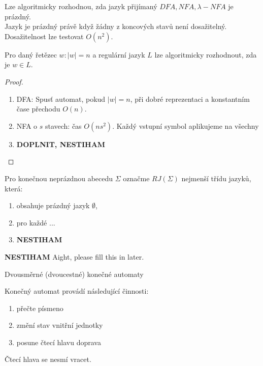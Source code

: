 \documentclass[../main.tex]{subfiles}
\begin{document}
\begin{theorem}
    Lze algoritmicky rozhodnou, zda jazyk přijímaný $DFA,NFA,\lambda -NFA$ je prázdný.\\
    Jazyk je prázdný právě když žádny z koncových stavů není dosažitelný. Dosažitelnost lze testovat $O(n^2)$.
\end{theorem}

\begin{theorem}
    Pro daný řetězec $w: |w| = n$ a regulární jazyk $L$ lze algoritmicky rozhodnout, zda je $w\in L$.
\end{theorem}
\begin{proof}
    \begin{enumerate}
        \item DFA: Spusť automat, pokud $|w| = n$, při dobré reprezentaci a konstantním čase přechodu $O(n)$.
        \item NFA o $s$ stavech: čas $O(ns^2)$. Každý vstupní symbol aplikujeme na všechny 
        \item \textbf{DOPLNIT, NESTIHAM}
    \end{enumerate}
\end{proof}

\begin{definition}
    Pro konečnou neprázdnou abecedu $\Sigma$ označme $RJ(\Sigma)$ nejmenší třídu jazyků, která:
    \begin{enumerate}
        \item obsahuje prázdný jazyk $\emptyset$,
        \item pro každé ... 
        \item \textbf{NESTIHAM}
    \end{enumerate}
\end{definition}
\begin{theorem}[Kleene]
    \textbf{NESTIHAM} Aight, please fill this in later.
\end{theorem}

Dvousměrné (dvoucestné) konečné automaty

Konečný automat provádí následující činnosti:
\begin{enumerate}
    \item přečte písmeno
    \item změní stav vnitřní jednotky
    \item posune čtecí hlavu doprava
\end{enumerate}

Čtecí hlava se nesmí vracet.
\end{document}
